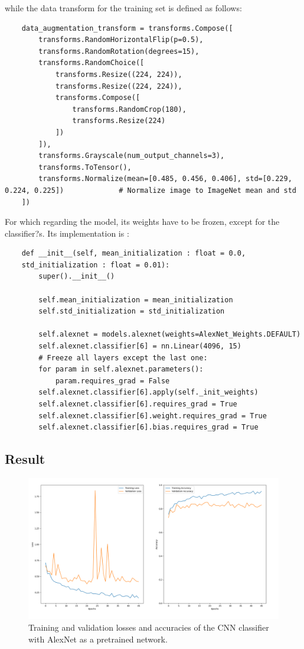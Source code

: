 \documentclass[12pt, a4paper, italian]{scrartcl}
\begin{document}
while the data transform for the training set is defined as follows:
    \begin{verbatim} 
    data_augmentation_transform = transforms.Compose([
        transforms.RandomHorizontalFlip(p=0.5),                                                      
        transforms.RandomRotation(degrees=15),                                                  
        transforms.RandomChoice([                                                                
            transforms.Resize((224, 224)),
            transforms.Resize((224, 224)),
            transforms.Compose([
                transforms.RandomCrop(180),
                transforms.Resize(224)
            ])
        ]),
        transforms.Grayscale(num_output_channels=3),
        transforms.ToTensor(),
        transforms.Normalize(mean=[0.485, 0.456, 0.406], std=[0.229, 0.224, 0.225])             # Normalize image to ImageNet mean and std
    ])
\end{verbatim}
  \newpage    
  
For which regarding the model, its weights have to be frozen, except for the classifier?s. Its implementation is :
    \begin{verbatim} 
    def __init__(self, mean_initialization : float = 0.0, 
    std_initialization : float = 0.01):
        super().__init__()

        self.mean_initialization = mean_initialization
        self.std_initialization = std_initialization

        self.alexnet = models.alexnet(weights=AlexNet_Weights.DEFAULT)
        self.alexnet.classifier[6] = nn.Linear(4096, 15)
        # Freeze all layers except the last one:
        for param in self.alexnet.parameters():
            param.requires_grad = False
        self.alexnet.classifier[6].apply(self._init_weights)
        self.alexnet.classifier[6].requires_grad = True
        self.alexnet.classifier[6].weight.requires_grad = True
        self.alexnet.classifier[6].bias.requires_grad = True
\end{verbatim}

\subsection{Result}
 \begin{figure} [h!]
 \centering
  { \includegraphics[width=.85\textwidth]{fig/loss_and_accuracy_task_3.png} \caption{Training and validation losses and accuracies of the CNN classifier with AlexNet as a pretrained network.
}} 
  \end{figure}
\end{document}
